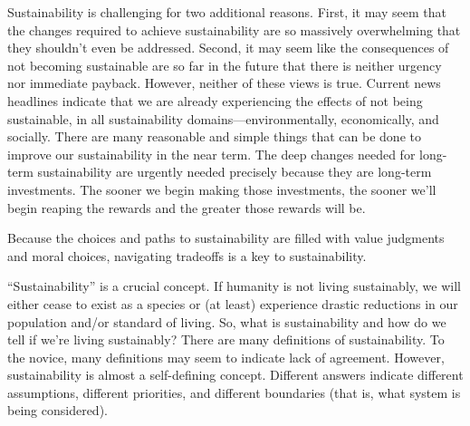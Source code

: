 \documentclass{article}\usepackage[]{graphicx}\usepackage[]{xcolor}
\begin{document}
Sustainability is challenging for two additional reasons.
First, it may seem that the changes required to achieve sustainability are so
massively overwhelming that they shouldn't even be addressed.
Second, it may seem like the consequences of not becoming sustainable are so far
in the future that there is neither urgency nor immediate payback.
However, neither of these views is true.
Current news headlines indicate that we are already
experiencing the effects of not being sustainable, in all
sustainability domains---environmentally, economically, and socially.
There are many reasonable and simple things that can be done to improve our
sustainability in the near term.
The deep changes needed for long-term sustainability are urgently needed precisely because
they are long-term investments.
The sooner we begin making those investments, the sooner we'll begin reaping the
rewards and the greater those rewards will be.

Because the choices and paths to sustainability are filled with 
value judgments and moral choices, 
navigating tradeoffs is a key to sustainability.



``Sustainability'' is a crucial concept.
If humanity is not living sustainably, 
we will either cease to exist as a species or (at least) 
experience drastic reductions in our population and/or standard of living.
So, what is sustainability and how do we tell if we're living sustainably?
There are many definitions of sustainability.
To the novice, many definitions may seem to indicate lack of agreement.
However, sustainability is almost a self-defining concept.
Different answers indicate different assumptions, different priorities, 
and different boundaries (that is, what system is being considered).
\end{document}
